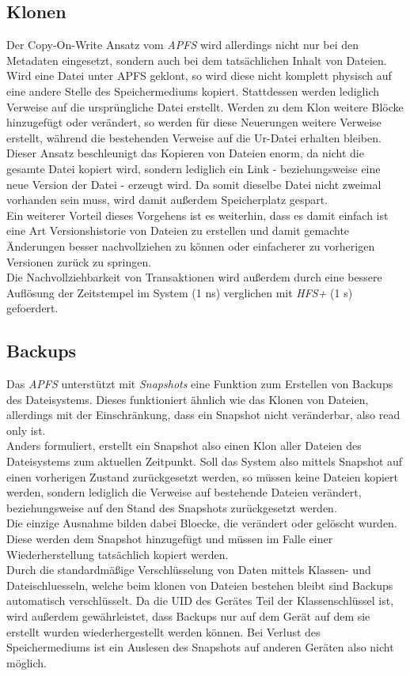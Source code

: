 \subsection{Klonen}
Der Copy-On-Write Ansatz vom \textit{APFS} wird allerdings nicht nur bei den Metadaten eingesetzt, sondern auch bei dem tatsächlichen Inhalt von Dateien. Wird eine Datei unter APFS geklont, so wird diese nicht komplett physisch auf eine andere Stelle des Speichermediums kopiert. Stattdessen werden lediglich Verweise auf die ursprüngliche Datei erstellt. Werden zu dem Klon weitere Blöcke hinzugefügt oder verändert, so werden für diese Neuerungen weitere Verweise erstellt, während die bestehenden Verweise auf die Ur-Datei erhalten bleiben.\\
Dieser Ansatz beschleunigt das Kopieren von Dateien enorm, da nicht die gesamte Datei kopiert wird, sondern lediglich ein Link - beziehungsweise eine neue Version der Datei - erzeugt wird\cite{about_apfs}. Da somit dieselbe Datei nicht zweimal vorhanden sein muss, wird damit außerdem Speicherplatz gespart.\\
Ein weiterer Vorteil dieses Vorgehens ist es weiterhin, dass es damit einfach ist eine Art Versionshistorie von Dateien zu erstellen und damit gemachte Änderungen besser nachvollziehen zu können oder einfacherer zu vorherigen Versionen zurück zu springen.\\
Die Nachvollziehbarkeit von Transaktionen wird außerdem durch eine bessere Auflösung der Zeitstempel im System (1 ns) verglichen mit \textit{HFS+} (1 s) gefoerdert\cite{arstechnica}.


\subsection{Backups}
Das \textit{APFS} unterstützt mit \textit{Snapshots} eine Funktion zum Erstellen von Backups des Dateisystems. Dieses funktioniert ähnlich wie das Klonen von Dateien, allerdings mit der Einschränkung, dass ein Snapshot nicht veränderbar, also read only ist\cite{arstechnica}.\\
Anders formuliert, erstellt ein Snapshot also einen Klon aller Dateien des Dateisystems zum aktuellen Zeitpunkt. Soll das System also mittels Snapshot auf einen vorherigen Zustand zurückgesetzt werden, so müssen keine Dateien kopiert werden, sondern lediglich die Verweise auf bestehende Dateien verändert, beziehungsweise auf den Stand des Snapshots zurückgesetzt werden.\\
Die einzige Ausnahme bilden dabei Bloecke, die verändert oder gelöscht wurden. Diese werden dem Snapshot hinzugefügt und müssen im Falle einer Wiederherstellung tatsächlich kopiert werden.\\
Durch die standardmäßige Verschlüsselung von Daten mittels Klassen- und Dateischluesseln, welche beim klonen von Dateien bestehen bleibt sind Backups automatisch verschlüsselt\cite[S. 50]{Apple2020}. Da die UID des Gerätes Teil der Klassenschlüssel ist\cite[S. 50]{Apple2020}, wird außerdem gewährleistet, dass Backups nur auf dem Gerät auf dem sie erstellt wurden wiederhergestellt werden können. Bei Verlust des Speichermediums ist ein Auslesen des Snapshots auf anderen Geräten also nicht möglich.


